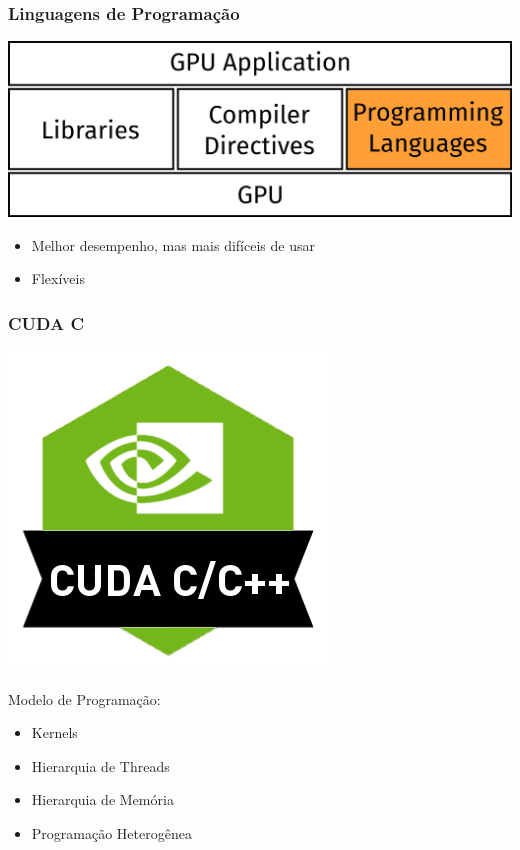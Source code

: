 \documentclass[10pt, compress]{beamer}
\begin{document}
\begin{frame}
    \frametitle{Linguagens de Programação}
    \begin{center}
        \includegraphics[width=.6\textwidth]{accel_apps_lang}
    \end{center}
    \begin{itemize}
        \item Melhor desempenho, mas mais difíceis de usar
        \item Flexíveis
    \end{itemize}
\end{frame}

\begin{frame}
    \frametitle{CUDA C}
    \begin{center}
        \includegraphics[width=.3\textwidth]{cuda-c}
    \end{center}
    Modelo de Programação:
    \begin{itemize}
        \item \alert{Kernels}
        \item Hierarquia de \alert{Threads}
        \item Hierarquia de \alert{Memória}
        \item Programação \alert{Heterogênea}
    \end{itemize}
\end{frame}
\end{document}
